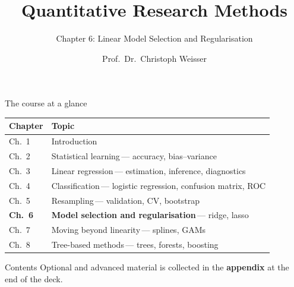 \documentclass[aspectratio=169,11pt]{beamer}
\title{Quantitative Research Methods}
\subtitle{Chapter 6: Linear Model Selection and Regularisation}
\author{Prof.\ Dr.\ Christoph Weisser}
\date{}\graphicspath{{images/}}
\begin{document}
\begin{frame}[plain]\titlepage\end{frame}

\begin{frame}{The course at a glance}
  \vspace{-1.5mm}
  \begin{center}
  \scriptsize
  \setlength{\tabcolsep}{5pt}
  \renewcommand{\arraystretch}{1.30}
  \begin{tabular}{@{\hspace{2pt}}l >{\raggedright\arraybackslash}p{}@{\hspace{2pt}}}
    \toprule
    \textbf{Chapter} & \textbf{Topic} \\
    \midrule
     {\color{accent}Ch.\ 1} & Introduction \\
    \rowcolor{black!3} {\color{accent}Ch.\ 2} & Statistical learning\,{\color{black!45}--- accuracy, bias--variance} \\
     {\color{accent}Ch.\ 3} & Linear regression\,{\color{black!45}--- estimation, inference, diagnostics} \\
    \rowcolor{black!3} {\color{accent}Ch.\ 4} & Classification\,{\color{black!45}--- logistic regression, confusion matrix, ROC} \\
     {\color{accent}Ch.\ 5} & Resampling\,{\color{black!45}--- validation, CV, bootstrap} \\
    \rowcolor{accent!18} \textbf{Ch.\ 6} & \textbf{Model selection and regularisation}\,{\color{accent!75!black}--- ridge, lasso} \\
     {\color{accent}Ch.\ 7} & Moving beyond linearity\,{\color{black!45}--- splines, GAMs} \\
    \rowcolor{black!3} {\color{accent}Ch.\ 8} & Tree-based methods\,{\color{black!45}--- trees, forests, boosting} \\
    \bottomrule
  \end{tabular}
  \end{center}
\end{frame}


\begin{frame}{Contents}\small
  \tableofcontents[hideallsubsections]
  \vfill
  {\tiny Optional and advanced material is collected in the \textbf{appendix} at the end of the deck.}
\end{frame}
\end{document}
